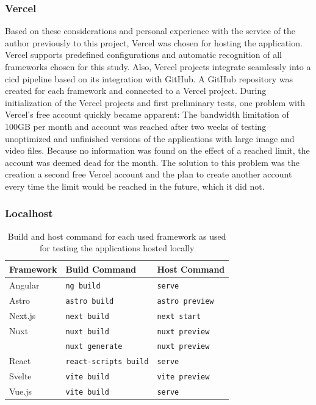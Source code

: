 \documentclass[a4paper, 12pt]{article}
\begin{document}
\subsubsection{Vercel}
Based on these considerations and personal experience with the service of the author previously to this project, Vercel was chosen for hosting the application.
Vercel supports predefined configurations and automatic recognition of all frameworks chosen for this study.
Also, Vercel projects integrate seamlessly into a \acrshort{cicd} pipeline based on its integration with GitHub.
A GitHub repository was created for each framework and connected to a Vercel project.
During initialization of the Vercel projects and first preliminary tests, one problem with Vercel's free account quickly became apparent:
The bandwidth limitation of 100GB per month and account was reached after two weeks of testing unoptimized and unfinished versions of the applications with large image and video files.
Because no information was found on the effect of a reached limit, the account was deemed dead for the month.
The solution to this problem was the creation a second free Vercel account and the plan to create another account every time the limit would be reached in the future, which it did not.

\subsubsection{Localhost}\label{subsubsec:localhost}
\begin{table}[h]
  \begin{center}
    \begin{tabular}[h]{| l | l | l |}
      \hline
      \textbf{Framework} & \textbf{Build Command} & \textbf{Host Command} \\ \hline
      Angular & \verb|ng build| & \verb|serve| \\ \hline
      Astro & \verb|astro build| & \verb|astro preview| \\ \hline
      Next.js & \verb|next build| & \verb|next start| \\ \hline
      Nuxt & \verb|nuxt build| & \verb|nuxt preview| \\
      & \verb|nuxt generate| & \verb|nuxt preview| \\ \hline
      React & \verb|react-scripts build| & \verb|serve| \\ \hline
      Svelte & \verb|vite build| & \verb|vite preview| \\ \hline
      Vue.js & \verb|vite build| & \verb|serve| \\ \hline
    \end{tabular}
  \end{center}
  \caption{Build and host command for each used framework as used for testing the applications hosted locally}\label{tab:hostCommands}
\end{table}
\end{document}
